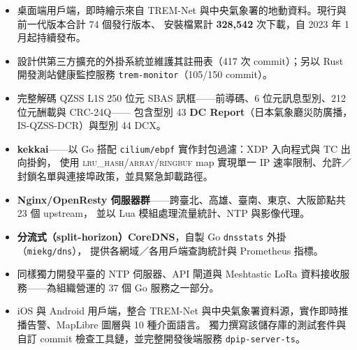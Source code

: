 \documentclass[10pt,a4paper]{article}
\begin{document}
\begin{itemize}
  \item 桌面端用戶端，即時繪示來自 TREM-Net 與中央氣象署的地動資料。現行與前一代版本合計 74 個發行版本、
        安裝檔累計 \textbf{328,542} 次下載，自 2023 年 1 月起持續發布。
  \item 設計供第三方擴充的外掛系統並維護其註冊表（417 次 commit）；另以 Rust 開發測站健康監控服務
        \texttt{trem-monitor}（105/150 commit）。
\end{itemize}

\begin{itemize}
  \item 完整解碼 QZSS L1S 250 位元 SBAS 訊框——前導碼、6 位元訊息型別、212 位元酬載與 CRC-24Q——
        包含型別 43 \textbf{DC Report}（日本氣象廳災防廣播，IS-QZSS-DCR）與型別 44 DCX。
\end{itemize}

\begin{itemize}
  \item \textbf{kekkai}——以 Go 搭配 \texttt{cilium/ebpf} 實作封包過濾：XDP 入向程式與 TC 出向掛鉤，
        使用 \textsc{lru\_hash}/\textsc{array}/\textsc{ringbuf} map 實現單一 IP 速率限制、允許／封鎖名單與連接埠政策，並具緊急卸載路徑。
  \item \textbf{Nginx/OpenResty 伺服器群}——跨臺北、高雄、臺南、東京、大阪節點共 23 個 upstream，
        並以 Lua 模組處理流量統計、NTP 與影像代理。
  \item \textbf{分流式（split-horizon）CoreDNS}，自製 Go \texttt{dnsstats} 外掛（\texttt{miekg/dns}），
        提供各網域／各用戶端查詢統計與 Prometheus 指標。
  \item 同樣獨力開發平臺的 NTP 伺服器、API 閘道與 Meshtastic LoRa 資料接收服務——為組織營運的 37 個 Go 服務之一部分。
\end{itemize}

\begin{itemize}
  \item iOS 與 Android 用戶端，整合 TREM-Net 與中央氣象署資料源，實作即時推播告警、MapLibre 圖層與 10 種介面語言。
        獨力撰寫該儲存庫的測試套件與自訂 commit 檢查工具鏈，並完整開發後端服務 \texttt{dpip-server-ts}。
\end{itemize}
\end{document}
